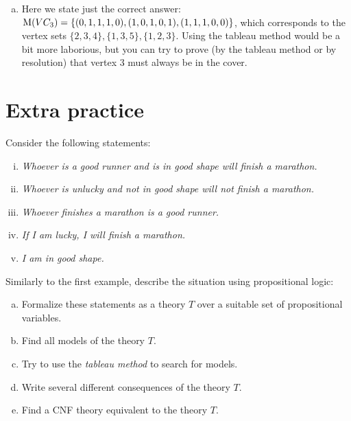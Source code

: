 \begin{problem}
\begin{solution}
\begin{enumerate}[(a)]
            \item Here we state just the correct answer: $\operatorname{M}(VC_3)=\{(0,1,1,1,0),(1,0,1,0,1),(1,1,1,0,0)\}$, which corresponds to the vertex sets $\{2,3,4\},\{1,3,5\},\{1,2,3\}$. Using the tableau method would be a bit more laborious, but you can try to prove (by the tableau method or by resolution) that vertex 3 must always be in the cover.
        \end{enumerate}
    \end{solution}

\end{problem}


\section*{Extra practice}


\begin{problem}
    
    Consider the following statements:
    \begin{enumerate}[(i)]
        \item {\it Whoever is a good runner and is in good shape will finish a marathon.}
        \item {\it Whoever is unlucky and not in good shape will not finish a marathon.}
        \item {\it Whoever finishes a marathon is a good runner.}
        \item {\it If I am lucky, I will finish a marathon.}
        \item {\it I am in good shape.}
    \end{enumerate}
    Similarly to the first example, describe the situation using propositional logic:
    \begin{enumerate}[(a)]
        \item Formalize these statements as a theory $T$ over a suitable set of propositional variables.
        \item Find all models of the theory $T$. 
        \item Try to use the \emph{tableau method} to search for models.
        \item Write several different consequences of the theory $T$.
        \item Find a CNF theory equivalent to the theory $T$.
    \end{enumerate}
    
\end{problem}


